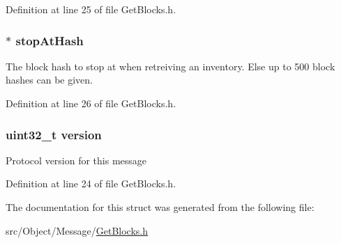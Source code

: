 Definition at line 25 of file GetBlocks.h.

\hypertarget{struct_get_blocks_a86c946e52ed46a9ef9f6292c0ec68143}{
\subsubsection[{stopAtHash}]{$\ast$ {\bf stopAtHash}}}
\label{struct_get_blocks_a86c946e52ed46a9ef9f6292c0ec68143}
The block hash to stop at when retreiving an inventory. Else up to 500 block hashes can be given. 

Definition at line 26 of file GetBlocks.h.

\hypertarget{struct_get_blocks_acd99bb05ca015e7d74448acb1deba7ca}{
\subsubsection[{version}]{\setlength{\rightskip}{0pt plus 5cm}uint32\_\-t {\bf version}}}
\label{struct_get_blocks_acd99bb05ca015e7d74448acb1deba7ca}
Protocol version for this message 

Definition at line 24 of file GetBlocks.h.



The documentation for this struct was generated from the following file:\begin{DoxyCompactItemize}
\item 
src/Object/Message/\hyperlink{_get_blocks_8h}{GetBlocks.h}\end{DoxyCompactItemize}
